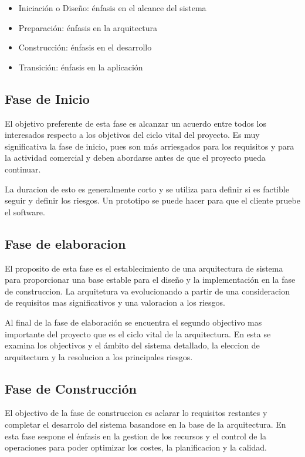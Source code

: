 \documentclass[spanish]{udpreport}
\begin{document}
\begin{itemize}
\item Iniciación o Diseño: énfasis en el alcance del sistema
\item Preparación: énfasis en la arquitectura
\item Construcción: énfasis en el desarrollo
\item Transición: énfasis en la aplicación

\end{itemize}

\subsection{Fase de Inicio}
\label{subsec:inicio}
El objetivo preferente de esta fase es alcanzar un acuerdo entre todos los interesados respecto a los objetivos del ciclo vital del proyecto.
Es muy significativa la fase de inicio, pues son más arriesgados para los requisitos y para la actividad comercial y deben abordarse antes de que el proyecto pueda continuar.\par
La duracion de esto es generalmente corto y se utiliza para definir si es factible seguir y definir los riesgos. Un prototipo se puede hacer para que el cliente pruebe el software.\par


\subsection{Fase de elaboracion}
\label{subsec:elaboracion}
El proposito de esta fase es el establecimiento de una arquitectura de sistema para proporcionar una base estable para el diseño y la implementación en la fase de construccion. La arquitetura va evolucionando  a partir de una consideracion de requisitos mas significativos y  una valoracion a los riesgos.\par
Al final de la fase de elaboración se encuentra el segundo objectivo mas importante del proyecto que es el ciclo vital de la arquitectura. En esta se examina los objectivos y el ámbito del sistema detallado, la eleccion de arquitectura y la resolucion a los principales riesgos.

\subsection{Fase de Construcción}
\label{subsec:construccion}
El objectivo de la fase de construccion es aclarar lo requisitos restantes y completar el desarrolo del sistema basandose en la base de la arquitectura.
En esta fase sespone el énfasis en la gestion de los recursos y el control de la operaciones para poder optimizar los costes, la planificacion y la calidad.\par
\end{document}
